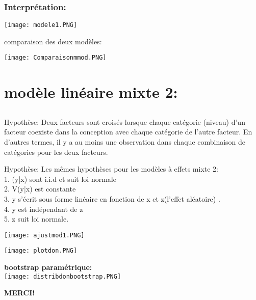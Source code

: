\documentclass[11pt]{beamer}
\begin{document}
\subsubsection{Interprétation: }
\begin{center}
    \texttt{[image: modele1.PNG]}
\end{center}

comparaison des deux modèles:
\begin{center}
    \texttt{[image: Comparaisonmmod.PNG]}
\end{center}



\section{modèle linéaire mixte 2:}
\subsection{}
\begin{frame}
\begin{block}{Hypothèse: }
Deux facteurs sont croisés lorsque chaque catégorie (niveau) d'un facteur coexiste dans la conception avec chaque catégorie de l'autre facteur. En d'autres termes, il y a au moins une observation dans chaque combinaison de catégories pour les deux facteurs.
\end{block}
\end{frame}
\begin{frame}
\begin{block}{Hypothèse: }
Les mêmes hypothèses pour les modèles à effets mixte 2:\\
1. (y|x) sont i.i.d et suit loi normale\\
2. V(y|x) est constante\\
3. y s'écrit sous forme linéaire en fonction de x et z(l'effet aléatoire) .\\
4. y est indépendant de z\\
5. z suit loi normale.\\
\end{block}
\end{frame}
\begin{frame}
\begin{center}
\texttt{[image: ajustmod1.PNG]}
\end{center}
\end{frame}
\begin{frame}
\begin{center}
\texttt{[image: plotdon.PNG]}
\end{center}
\end{frame}
\begin{frame}
\begin{center}
\textbf{bootstrap paramétrique:}\\
\texttt{[image: distribdonbootstrap.PNG]}
\end{center}
\end{frame}



\begin{frame}[plain]{}
\begin{center}
    \LARGE\color{blue}
\textbf{MERCI!}
\end{center}
\end{frame}
\end{document}
